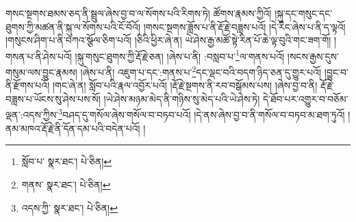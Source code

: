 གསང་སྔགས་ཐམས་ཅད་ནི་སྦྲུལ་ཞེས་བྱ་བ་ལ་སོགས་པའི་རིགས་ཏེ། ཚོགས་རྣམས་ཀྱིའོ། །སྐུ་དང་གསུང་དང་ཐུགས་ཀྱི་མཚན་ནི་སྐུ་ལ་སོགས་པའི་ངོ་བོའོ། །གསང་སྔགས་ཟློས་པ་ནི་རྡོ་རྗེ་བཟླས་པའོ། །དེ་རིང་ཞེས་པ་ནི་ད་ལྟའོ། །གསུངས་ཤིག་པ་ནི་བཀའ་སྩོལ་ཅིག་པའོ། །ཅིའི་ཕྱིར་ཞེ་ན། ཡེ་ཤེས་རྒྱ་མཚོ་སྟེ་རིན་པོ་ཆེ་ལྟ་བུའི་གང་ཟག་གོ། །གསན་པ་ནི་ཤེས་པའོ། །སྐུ་གསུང་ཐུགས་ཀྱི་རྡོ་རྗེ་ཅན། །ཞེས་པ་ནི། :བསླབ་པ་\footnote{སློབ་པ་  སྣར་ཐང་།  པེ་ཅིན། }ལ་གནས་པའོ། །སངས་རྒྱས་དུས་གསུམ་ལས་བྱུང་རྣམས། །ཞེས་པ་ནི། འཇུག་པ་དང་:གནས་པ་\footnote{གནས་  སྣར་ཐང་།  པེ་ཅིན། }དང་ལྡང་བའི་བདག་ཉིད་ཅན་དུ་གྱུར་པའོ། །བྱུང་བ་ནི་རྫོགས་པའོ། །གང་ཞེ་ན། སློབ་པའི་རྣལ་འབྱོར་པའོ། །རྡོ་རྗེ་སྔགས་ནི་རབ་བསྒོམས་པས། །ཞེས་བྱ་བ་ནི། རྡོ་རྗེ་བཟླས་པ་ཡོངས་སུ་ཤེས་པས་སོ། །ཡེ་ཤེས་མཉམ་མེད་ནི་གཉིས་སུ་མེད་པའི་ཡེ་ཤེས་ཏེ། དེ་ཐོབ་པར་འགྱུར་བ་བཅོམ་ལྡན་:འདས་ཀྱིས་\footnote{འདས་ཀྱི་  སྣར་ཐང་།  པེ་ཅིན། }བཤད་དུ་གསོལ་ཞེས་གསོལ་བ་བཏབ་པའོ། །དེ་ནས་ཞེས་བྱ་བ་ནི་གསོལ་བ་བཏབ་མ་ཐག་ཏུའོ། །ནམ་མཁའ་རྡོ་རྗེ་ནི་དོན་དམ་པའི་བདེན་པའོ། །
